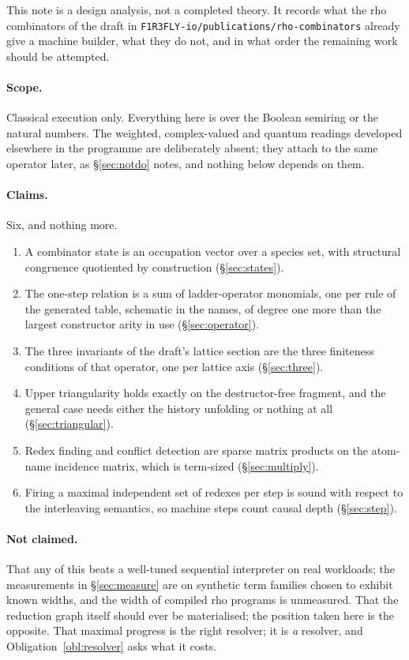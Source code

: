 \documentclass[11pt,a4paper]{article}
\theoremstyle{plain}
\theoremstyle{definition}
\theoremstyle{remark}
\newcommand{\rhoc}{\textsf{rho}}
\begin{document}
This note is a design analysis, not a completed theory. It records what the
rho combinators of the draft in \texttt{F1R3FLY-io/publications/rho-combinators}
already give a machine builder, what they do not, and in what order the
remaining work should be attempted.

\paragraph{Scope.} Classical execution only. Everything here is over the
Boolean semiring or the natural numbers. The weighted, complex-valued and
quantum readings developed elsewhere in the programme are deliberately absent;
they attach to the same operator later, as \S\ref{sec:notdo} notes, and
nothing below depends on them.

\paragraph{Claims.} Six, and nothing more.
\begin{enumerate}[label=(C\arabic*),leftmargin=3em]
\item A combinator state is an occupation vector over a species set, with
  structural congruence quotiented by construction
  (\S\ref{sec:states}).
\item The one-step relation is a sum of ladder-operator monomials, one per
  rule of the generated table, schematic in the names, of degree one more
  than the largest constructor arity in use (\S\ref{sec:operator}).
\item The three invariants of the draft's lattice section are the three
  finiteness conditions of that operator, one per lattice axis
  (\S\ref{sec:three}).
\item Upper triangularity holds exactly on the destructor-free fragment, and
  the general case needs either the history unfolding or nothing at all
  (\S\ref{sec:triangular}).
\item Redex finding and conflict detection are sparse matrix products on the
  atom-name incidence matrix, which is term-sized (\S\ref{sec:multiply}).
\item Firing a maximal independent set of redexes per step is sound with
  respect to the interleaving semantics, so machine steps count causal depth
  (\S\ref{sec:step}).
\end{enumerate}

\paragraph{Not claimed.} That any of this beats a well-tuned sequential
interpreter on real workloads; the measurements in \S\ref{sec:measure} are on
synthetic term families chosen to exhibit known widths, and the width of
compiled \rhoc{} programs is unmeasured. That the reduction graph itself
should ever be materialised; the position taken here is the opposite. That
maximal progress is the right resolver; it is \emph{a} resolver, and
Obligation~\ref{obl:resolver} asks what it costs.
\end{document}
